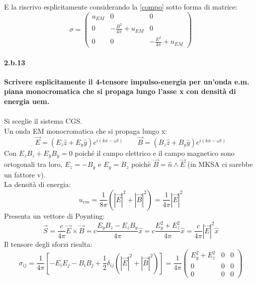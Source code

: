\documentclass[twoside]{article}
\begin{document}
E la riscrivo esplicitamente considerando la \ref{compo} sotto forma di matrice:
\begin{equation}
    \sigma=\begin{pmatrix}
        u_{EM} & 0 & 0 \\
        0 & -\frac{B^2}{4\pi}+u_{EM}
& 0 \\
0 & 0 & -\frac{E^2}{4\pi}+u_{EM}

\end{pmatrix}
\end{equation}



\paragraph{2.b.13}\textbf{Scrivere esplicitamente il 4-tensore impulso-energia per un’onda e.m. piana monocromatica che si propaga lungo l’asse x con densità di energia uem.}\\ \\
Si sceglie il sistema CGS.\\
Un onda EM monocromatica che si propaga lungo x:
\begin{equation}
    \vec{E}=(E_z\hat{z}+E_y\hat{y})e^{i(kx-\omega t)} \qquad \vec{B}=(B_z\hat{z}+B_y\hat{y})e^{i(kx-\omega t)}
\end{equation}
Con $E_zB_z+E_yB_y=0$ poiché il campo elettrico e il campo magnetico sono ortogonali tra loro, $E_z=-B_y$ e $E_y=B_z$ poichè $\vec{B}=\hat{n}\wedge\vec{E}$ (in MKSA ci sarebbe un fattore v).\\
La densità di energia:
\begin{equation}
    u_{em}=\frac{1}{8\pi}(|\vec{E}|^2+|\vec{B}|^2)=\frac{1}{4\pi}|\vec{E}|^2
\end{equation}
Presenta un vettore di Poynting:
\begin{equation}
   \vec{S}=\frac{c}{4\pi}\vec{E}\times\vec{B}=c\frac{E_yB_z-E_zB_y}{4\pi}\hat{x}=c\frac{E_y^2+E_z^2}{4\pi}\hat{x}=\frac{c}{4\pi}|\vec{E}|^2\hat{x}
\end{equation}
Il tensore degli sforzi risulta:
\begin{equation}
        \sigma_{ij}=\frac{1}{4\pi}[-E_iE_j-B_iB_j+\frac{1}{2}\delta_{ij}(|\vec{E}|^2+|\vec{B}|^2)]=\frac{1}{4\pi}\begin{pmatrix}
      E_y^2+E_z^2 & 0 & 0\\ 0 & 0 & 0 \\ 0 & 0 & 0
    \end{pmatrix}
\end{equation}
\end{document}
